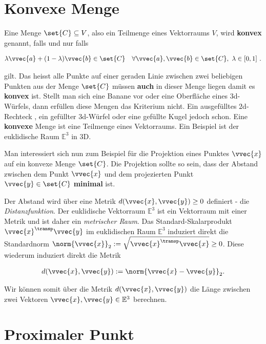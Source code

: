 \documentclass[
  12pt,
  american,
  a4paper,
  twoside,
  titlepage,
  openright,
  numbers=noenddot,
  chapterprefix=true,
  headings=optiontohead,
  svgnames,
  dvipsnames]{scrreprt}
\begin{document}
\hypertarget{konvexe-menge}{%
\section{Konvexe Menge}\label{konvexe-menge}}

Eine Menge \(\set{C} \subseteq V\), also ein Teilmenge eines Vektorraums
\(V\), wird \textbf{konvex} genannt, falls und nur falls

\begin{align}
\lambda \vvec{a} + (1-\lambda) \vvec{b} \in \set{C} \quad \forall \vvec{a},\vvec{b} \in \set{C}, \ \lambda \in [0,1] \ .
\end{align}

gilt. Das heisst alle Punkte auf einer geraden Linie zwischen zwei
beliebigen Punkten aus der Menge \(\set{C}\) müssen \textbf{auch} in
dieser Menge liegen damit es \textbf{konvex} ist. Stellt man sich eine
Banane vor oder eine Oberfläche eines \(3\)d-Würfels, dann erfüllen
diese Mengen das Kriterium nicht. Ein ausgefülltes \(2\)d-Rechteck , ein
gefüllter \(3\)d-Würfel oder eine gefüllte Kugel jedoch schon. Eine
\textbf{konvexe} Menge ist eine Teilmenge eines Vektorraums. Ein
Beispiel ist der euklidische Raum \(\mathbb{E}^3\) in \(3\)D.

Man interessiert sich nun zum Beispiel für die Projektion eines Punktes
\(\vvec{x}\) auf ein konvexe Menge \(\set{C}\). Die Projektion sollte so
sein, dass der Abstand zwischen dem Punkt \(\vvec{x}\) und dem
projezierten Punkt \(\vvec{y} \in \set{C}\) \textbf{minimal} ist.

Der Abstand wird über eine Metrik \(d(\vvec{x},\vvec{y}) \geq 0\)
definiert - die \emph{Distanzfunktion}. Der euklidische Vektorraum
\(\mathbb{E}^3\) ist ein Vektorraum mit einer Metrik und ist daher ein
\emph{metrischer Raum}. Das Standard-Skalarprodukt
\(\vvec{x}^\transp \vvec{y}\) im euklidischen Raum \(\mathbb{E}^3\)
induziert direkt die Standardnorm
\(\norm{\vvec{x}}_2 := \sqrt{\vvec{x}^\transp \vvec{x}} \geq 0\). Diese
wiederum induziert direkt die Metrik

\begin{align}
d(\vvec{x},\vvec{y}) := \norm{\vvec{x} - \vvec{y}}_2.
\end{align}

Wir können somit über die Metrik \(d(\vvec{x},\vvec{y})\) die Länge
zwischen zwei Vektoren \(\vvec{x},\vvec{y} \in \mathbb{E}^3\) berechnen.

\hypertarget{proximaler-punkt}{%
\section{Proximaler Punkt}\label{proximaler-punkt}}
\end{document}
